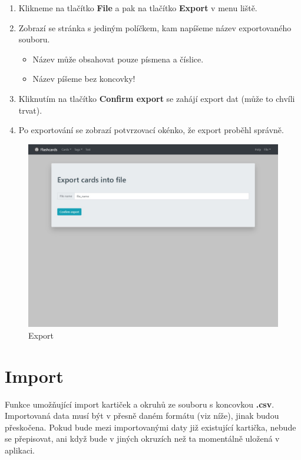 \documentclass[11pt]{article}
\providecommand{\tightlist}{\setlength{\itemsep}{1pt}\setlength{\parskip}{1pt}}
\begin{document}
\begin{enumerate}
\def\labelenumi{\arabic{enumi}.}
\tightlist
\item
  Klikneme na tlačítko \textbf{File} a pak na tlačítko \textbf{Export} v
  menu liště.
\item
  Zobrazí se stránka s jediným políčkem, kam napíšeme název
  exportovaného souboru.

  \begin{itemize}
  \tightlist
  \item
    Název může obsahovat pouze písmena a číslice.
  \item
    Název píšeme bez koncovky!
  \end{itemize}
\item
  Kliknutím na tlačítko \textbf{Confirm export} se zahájí export dat
  (může to chvíli trvat).
\item
  Po exportování se zobrazí potvrzovací okénko, že export proběhl
  správně.
\end{enumerate}

\begin{figure}
\centering
\includegraphics{../../../../assets/export.jpg}
\caption{Export}
\end{figure}

\hypertarget{import}{%
\section{Import}\label{import}}

Funkce umožňující import kartiček a okruhů ze souboru s koncovkou
\textbf{.csv}. Importovaná data musí být v přesně daném formátu (viz
níže), jinak budou přeskočena. Pokud bude mezi importovanými daty již
existující kartička, nebude se přepisovat, ani když bude v jiných
okruzích než ta momentálně uložená v aplikaci.
\end{document}
